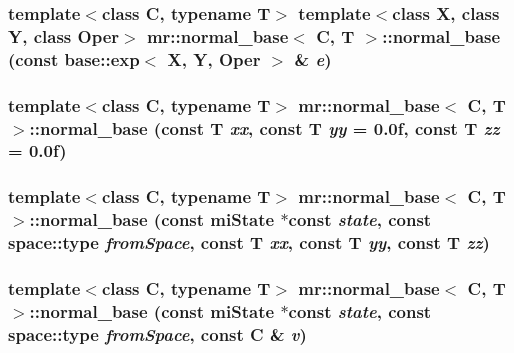 \subsubsection{\setlength{\rightskip}{0pt plus 5cm}template$<$class C, typename T$>$ template$<$class X, class Y, class Oper$>$ {\bf mr::normal\_\-base}$<$ C, T $>$::{\bf normal\_\-base} (const {\bf base::exp}$<$ X, Y, Oper $>$ \& {\em e})\hspace{0.3cm}{\tt  [inline]}}\label{structmr_1_1normal__base_z66_4}


\subsubsection{\setlength{\rightskip}{0pt plus 5cm}template$<$class C, typename T$>$ {\bf mr::normal\_\-base}$<$ C, T $>$::{\bf normal\_\-base} (const T {\em xx}, const T {\em yy} = 0.0f, const T {\em zz} = 0.0f)\hspace{0.3cm}{\tt  [inline]}}\label{structmr_1_1normal__base_z66_5}


\subsubsection{\setlength{\rightskip}{0pt plus 5cm}template$<$class C, typename T$>$ {\bf mr::normal\_\-base}$<$ C, T $>$::{\bf normal\_\-base} (const mi\-State $\ast$const {\em state}, const {\bf space::type} {\em from\-Space}, const T {\em xx}, const T {\em yy}, const T {\em zz})\hspace{0.3cm}{\tt  [inline]}}\label{structmr_1_1normal__base_z66_6}


\subsubsection{\setlength{\rightskip}{0pt plus 5cm}template$<$class C, typename T$>$ {\bf mr::normal\_\-base}$<$ C, T $>$::{\bf normal\_\-base} (const mi\-State $\ast$const {\em state}, const {\bf space::type} {\em from\-Space}, const C \& {\em v})\hspace{0.3cm}{\tt  [inline]}}\label{structmr_1_1normal__base_z66_7}


